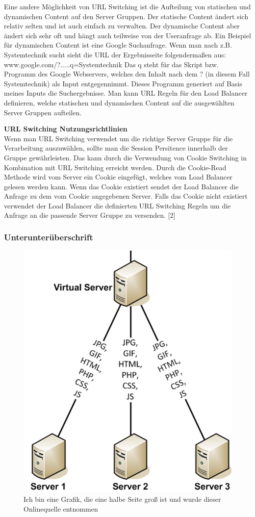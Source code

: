 Eine andere Möglichkeit von URL Switching ist die Aufteilung von statischen und dynamischen Content auf den Server Gruppen. Der statische Content ändert sich relativ selten und ist auch einfach zu verwalten. Der dynamische Content aber ändert sich sehr oft und hängt auch teilweise von der Useranfrage ab. 
Ein Beispiel für dynamischen Content ist eine Google Suchanfrage. Wenn man nach z.B. Systemtechnik sucht sieht die URL der Ergebnisseite folgendermaßen aus: 
www.google.com/?.....q=Systemtechnik
Das q steht für das Skript bzw. Programm des Google Webservers, welches den Inhalt nach dem ? (in diesem Fall Systemtechnik) als Input entgegennimmt. Dieses Programm generiert auf Basis meines Inputs die Suchergebnisse.
Man kann URL Regeln für den Load Balancer definieren, welche statischen und dynamischen Content auf die ausgewählten Server Gruppen aufteilen. 

\textbf{URL Switching Nutzungsrichtlinien} \\

Wenn man URL Switching verwendet um die richtige Server Gruppe für die Verarbeitung auszuwählen, sollte man die Session Persitence innerhalb der Gruppe gewährleisten. Das kann durch die Verwendung von Cookie Switching in Kombination mit URL Switching erreicht werden. Durch die Cookie-Read Methode wird vom Server ein Cookie eingefügt, welches vom Load Balancer gelesen werden kann. Wenn das Cookie existiert sendet der Load Balancer die Anfrage zu dem vom Cookie angegebenen Server. Falls das Cookie nicht existiert verwendet der Load Balancer die definierten URL Switching Regeln um die Anfrage an die passende Server Gruppe zu versenden. [2]

\subsubsection{Unterunterüberschrift}
\label{sec:Unterunterüberschrift}

\begin{figure}[!h]
	\begin{center}
		\includegraphics[width=0.5\linewidth]{images/Grafik.png}
		\caption{Ich bin eine Grafik, die eine halbe Seite groß ist und wurde dieser Onlinequelle entnommen \cite{LoadBalancing}}
		\label{Grafik}
	\end{center}
\end{figure}

